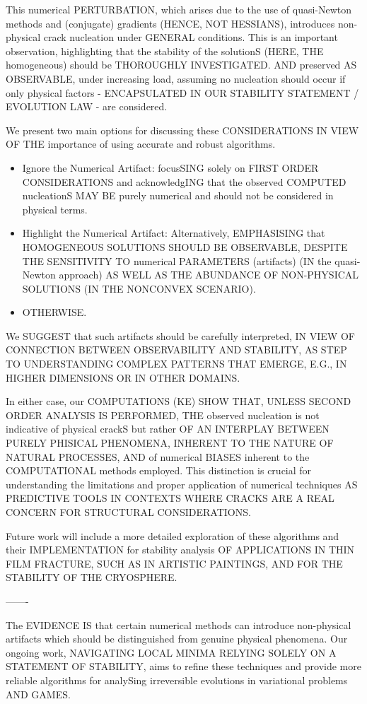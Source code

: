This numerical PERTURBATION, which arises due to the use of quasi-Newton methods and (conjugate) gradients (HENCE, NOT HESSIANS), introduces non-physical crack nucleation under GENERAL conditions. This is an important observation, highlighting that the stability of the solutionS (HERE, THE homogeneous) should be THOROUGHLY INVESTIGATED. AND preserved AS OBSERVABLE, under increasing load, assuming no nucleation should occur if only physical factors - ENCAPSULATED IN OUR STABILITY STATEMENT / EVOLUTION LAW - are considered.

We present two main options for discussing these CONSIDERATIONS IN VIEW OF THE importance of using accurate and robust algorithms.

\begin{itemize}
    \item 
    Ignore the Numerical Artifact: focusSING solely on FIRST ORDER CONSIDERATIONS and acknowledgING that the observed COMPUTED nucleationS MAY BE purely numerical and should not be considered in physical terms.
    \item 
    Highlight the Numerical Artifact: Alternatively, EMPHASISING that HOMOGENEOUS SOLUTIONS SHOULD BE OBSERVABLE, DESPITE 
    THE SENSITIVITY TO numerical PARAMETERS (artifacts) (IN the quasi-Newton approach) AS WELL AS THE ABUNDANCE OF NON-PHYSICAL SOLUTIONS (IN THE NONCONVEX SCENARIO).
    \item 
    OTHERWISE.
\end{itemize}


We SUGGEST that such artifacts should be carefully interpreted, IN VIEW OF CONNECTION BETWEEN OBSERVABILITY AND STABILITY, AS STEP TO UNDERSTANDING COMPLEX PATTERNS THAT EMERGE, E.G., IN HIGHER DIMENSIONS OR IN OTHER DOMAINS.

In either case, our COMPUTATIONS (KE) SHOW THAT, UNLESS SECOND ORDER ANALYSIS IS PERFORMED, THE observed nucleation is not indicative of physical crackS but rather OF AN INTERPLAY BETWEEN PURELY PHISICAL PHENOMENA, INHERENT TO THE NATURE OF NATURAL PROCESSES, AND of numerical BIASES inherent to the COMPUTATIONAL methods employed. This distinction is crucial for understanding the limitations and proper application of numerical techniques AS PREDICTIVE TOOLS IN CONTEXTS WHERE CRACKS ARE A REAL CONCERN FOR STRUCTURAL CONSIDERATIONS.

Future work will include a more detailed exploration of these algorithms and their IMPLEMENTATION for stability analysis OF APPLICATIONS IN THIN FILM FRACTURE, SUCH AS IN ARTISTIC PAINTINGS, AND FOR THE STABILITY OF THE CRYOSPHERE.

-------

The EVIDENCE IS that certain numerical methods can introduce non-physical artifacts which should be distinguished from genuine physical phenomena. Our ongoing work, NAVIGATING LOCAL MINIMA RELYING SOLELY ON A STATEMENT OF STABILITY, aims to refine these techniques and provide more reliable algorithms for analySing irreversible evolutions in variational problems AND GAMES.


